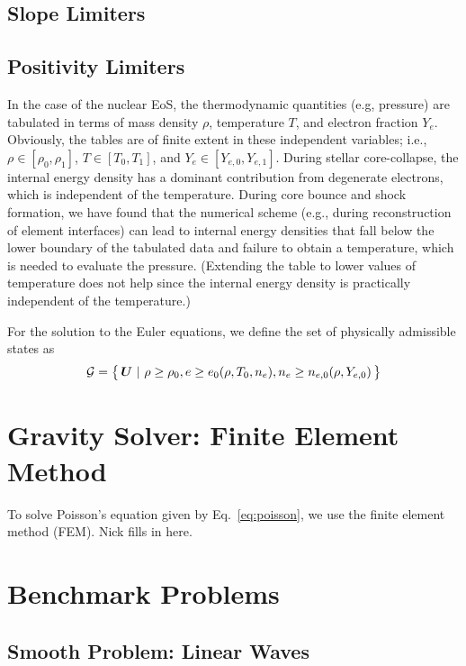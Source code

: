 \documentclass[10pt,preprint]{aastex}
\newcommand{\ee}[1]{{\color{red} #1}}
\begin{document}
\subsection{Slope Limiters}

\subsection{Positivity Limiters}

In the case of the nuclear EoS, the thermodynamic quantities (e.g, pressure) are tabulated in terms of mass density $\rho$, temperature $T$, and electron fraction $Y_{e}$.  
Obviously, the tables are of finite extent in these independent variables; i.e., $\rho\in[\rho_{0},\rho_{1}]$, $T\in[T_{0},T_{1}]$, and $Y_{e}\in[Y_{e,0},Y_{e,1}]$.  
During stellar core-collapse, the internal energy density has a dominant contribution from degenerate electrons, which is independent of the temperature.  
During core bounce and shock formation, we have found that the numerical scheme (e.g., during reconstruction of element interfaces) can lead to internal energy densities that fall below the lower boundary of the tabulated data and failure to obtain a temperature, which is needed to evaluate the pressure.  
(Extending the table to lower values of temperature does not help since the internal energy density is practically independent of the temperature.)

For the solution to the Euler equations, we define the set of physically admissible states as
\begin{equation}
  \mathcal{G}=\big\{\,\boldsymbol{U}~|~\rho\ge\rho_{0}, e\ge e_{0}(\rho,T_{0},n_{e}),n_{e}\ge n_{e,0}(\rho,Y_{e,0})\,\big\}
\end{equation}


\section{Gravity Solver: Finite Element Method}

To solve Poisson's equation given by Eq.~\eqref{eq:poisson}, we use the finite element method (FEM).  
\ee{Nick fills in here}.  

\section{Benchmark Problems}

\subsection{Smooth Problem: Linear Waves}
\end{document}
